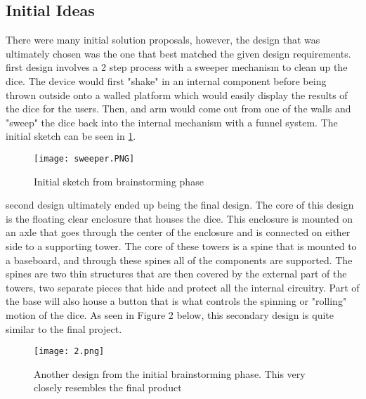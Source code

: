 \documentclass[12pt]{article}
\begin{document}
\subsection{Initial Ideas}
There were many initial solution proposals, however, the design that was ultimately chosen was the one that best matched the given design requirements. 
 first design involves a 2 step process with a sweeper mechanism to clean up the dice. The device would first "shake" in an internal component before being thrown outside onto a walled platform which would easily display the results of the dice for the users. Then, and arm would come out from one of the walls and "sweep" the dice back into the internal mechanism with a funnel system. The initial sketch can be seen in \ref{fig:sweeper sketch}.
\begin{figure}[H]
\centering
    \texttt{[image: sweeper.PNG]}
    \caption{Initial sketch from brainstorming phase}
    \label{fig:sweeper sketch}
\end{figure}
 second design ultimately ended up being the final design. The core of this design is the floating clear enclosure that houses the dice. This enclosure is mounted on an axle that goes through the center of the enclosure and is connected on either side to a supporting tower. The core of these towers is a spine that is mounted to a baseboard, and through these spines all of the components are supported. The spines are two thin structures that are then covered by the external part of the towers, two separate pieces that hide and protect all the internal circuitry. Part of the base will also house a button that is what controls the spinning or "rolling" motion of the dice. As seen in Figure 2 below, this secondary design is quite similar to the final project.

\begin{figure}[H]
\centering
    \texttt{[image: 2.png]}
    \caption{Another design from the initial brainstorming phase. This very closely resembles the final product}
    \label{fig:floating sketch}
\end{figure}
\end{document}
